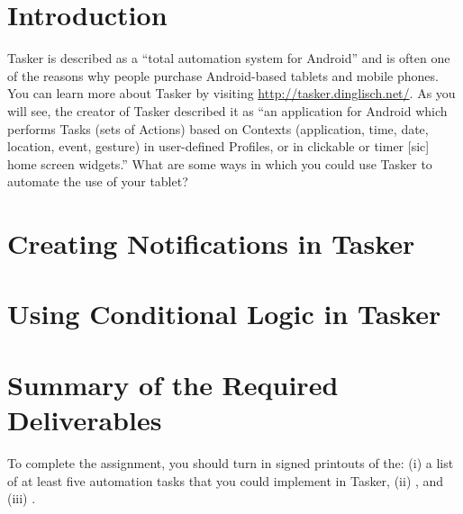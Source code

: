 

\usepackage[compact]{titlesec}



\section*{Introduction}

Tasker is described as a ``total automation system for Android'' and is often one of the reasons why people purchase
Android-based tablets and mobile phones.  You can learn more about Tasker by visiting
\url{http://tasker.dinglisch.net/}. As you will see, the creator of Tasker described it as ``an application for Android
which performs Tasks (sets of Actions) based on Contexts (application, time, date, location, event, gesture) in
user-defined Profiles, or in clickable or timer [sic] home screen widgets.''  What are some ways in which you could use
Tasker to automate the use of your tablet?

\section*{Creating Notifications in Tasker}

\section*{Using Conditional Logic in Tasker}

\section*{Summary of the Required Deliverables}

To complete the assignment, you should turn in signed printouts of the: (i) a list of at least five automation tasks
that you could implement in Tasker, (ii) , and (iii) .


